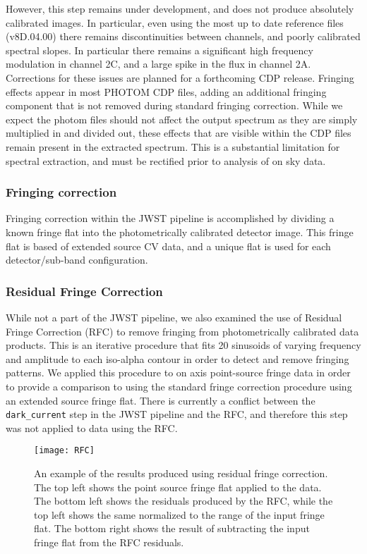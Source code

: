 However, this step remains under development, and does not produce absolutely calibrated images. In particular, even using the most up to date reference files (v8D.04.00) there remains discontinuities between channels, and poorly calibrated spectral slopes.
In particular there remains a significant high frequency modulation in channel 2C, and a large spike in the flux in channel 2A.
Corrections for these issues are planned for a forthcoming CDP release.
Fringing effects appear in most PHOTOM CDP files, adding an additional fringing component that is not removed during standard fringing correction.
While we expect the photom files should not affect the output spectrum as they are simply multiplied in and divided out, these effects that are visible within the CDP files remain present in the extracted spectrum.
This is a substantial limitation for spectral extraction, and must be rectified prior to analysis of on sky data. 


\subsubsection{Fringing correction}
Fringing correction within the JWST pipeline is accomplished by dividing a known fringe flat into the photometrically calibrated detector image. 
This fringe flat is based of extended source CV data, and a unique flat is used for each detector/sub-band configuration.

\subsubsection{Residual Fringe Correction}
While not a part of the JWST pipeline, we also examined the use of Residual Fringe Correction (RFC) \parencite{Lahuis2003,Lahuis2018} to remove fringing from photometrically calibrated data products. 
This is an iterative procedure that fits 20 sinusoids of varying frequency and amplitude to each iso-alpha contour in order to detect and remove fringing patterns.
We applied this procedure to on axis point-source fringe data in order to provide a comparison to using the standard fringe correction procedure using an extended source fringe flat.
There is currently a conflict between the \verb|dark_current| step in the JWST pipeline and the RFC, and therefore this step was not applied to data using the RFC.
\begin{figure}[t]
	\centering
	\texttt{[image: RFC]}
	\caption{An example of the results produced using residual fringe correction. The top left shows the point source fringe flat applied to the data. The bottom left shows the residuals produced by the RFC, while the top left shows the same normalized to the range of the input fringe flat. The bottom right shows the result of subtracting the input fringe flat from the RFC residuals.}
	\label{fig:RFC}
\end{figure}

